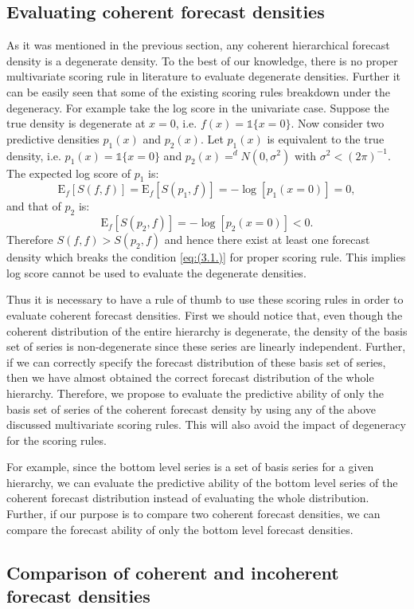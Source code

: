 \documentclass[a4paper, 11pt]{article}
\def\E{\text{E}}
\begin{document}
\subsection{Evaluating coherent forecast densities}

As it was mentioned in the previous section, any coherent hierarchical forecast density is a degenerate density. To the best of our knowledge, there is no proper multivariate scoring rule in literature to evaluate degenerate densities. Further it can be easily seen that some of the existing scoring rules breakdown under the degeneracy. For example take the log score in the univariate case. Suppose the true density is degenerate at $x=0$, i.e. $f(x)=\mathbb{1}\{x=0\}$.  Now consider two predictive densities $p_1(x)$ and $p_2(x)$. Let $p_1(x)$ is equivalent to the true density, i.e. $p_1(x)=\mathbb{1}\{x=0\}$ and $p_2(x) =^d N(0,\sigma^2)$ with $\sigma^2 < (2\pi)^{-1}$. The expected log score of $p_1$ is:
$$
\E_f[S(f,f)] = \E_f[S(p_1,f)] = -\log[p_1(x=0)]=0,
$$
and that of $p_2$ is:
$$
\E_f[S(p_2,f)] = -\log[p_2(x=0)]<0.
$$
Therefore $S(f,f) > S(p_2,f)$ and hence there exist at least one forecast density which breaks the condition \eqref{eq:(3.1.)} for proper scoring rule. This implies log score cannot be used to evaluate the degenerate densities.

Thus it is necessary to have a rule of thumb to use these scoring rules in order to evaluate coherent forecast densities. First we should notice that, even though the coherent distribution of the entire hierarchy is degenerate, the density of the basis set of series is non-degenerate since these series are linearly independent. Further, if we can correctly specify the forecast distribution of these basis set of series, then we have almost obtained the correct forecast distribution of the whole hierarchy. Therefore, we propose to evaluate the predictive ability of only the basis set of series of the coherent forecast density by using any of the above discussed multivariate scoring rules. This will also avoid the impact of degeneracy for the scoring rules.

For example, since the bottom level series is a set of basis series for a given hierarchy, we can evaluate the predictive ability of the bottom level series of the coherent forecast distribution instead of evaluating the whole distribution. Further, if our purpose is to compare two coherent forecast densities, we can compare the forecast ability of only the bottom level forecast densities.

\subsection{Comparison of coherent and incoherent forecast densities}
\end{document}
